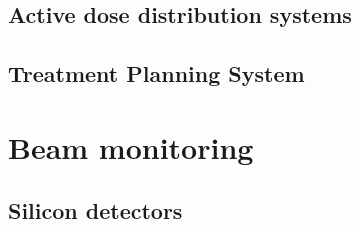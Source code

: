 \subsection{Active dose distribution systems}

\subsection{Treatment Planning System}

\section{Beam monitoring}

\subsection{Silicon detectors}
















































